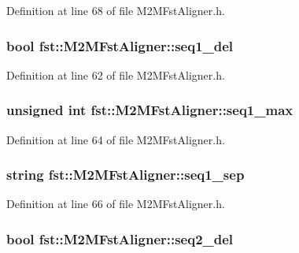 Definition at line 68 of file M2\+M\+Fst\+Aligner.\+h.

\subsubsection[{seq1\+\_\+del}]{\setlength{\rightskip}{0pt plus 5cm}bool fst\+::\+M2\+M\+Fst\+Aligner\+::seq1\+\_\+del}\hypertarget{classfst_1_1_m2_m_fst_aligner_a1ea4cfa480a906720412d89e3cbdf78f}{}\label{classfst_1_1_m2_m_fst_aligner_a1ea4cfa480a906720412d89e3cbdf78f}


Definition at line 62 of file M2\+M\+Fst\+Aligner.\+h.

\subsubsection[{seq1\+\_\+max}]{\setlength{\rightskip}{0pt plus 5cm}unsigned int fst\+::\+M2\+M\+Fst\+Aligner\+::seq1\+\_\+max}\hypertarget{classfst_1_1_m2_m_fst_aligner_ab83262d3fb217a148435777d28dcf3bd}{}\label{classfst_1_1_m2_m_fst_aligner_ab83262d3fb217a148435777d28dcf3bd}


Definition at line 64 of file M2\+M\+Fst\+Aligner.\+h.

\subsubsection[{seq1\+\_\+sep}]{\setlength{\rightskip}{0pt plus 5cm}string fst\+::\+M2\+M\+Fst\+Aligner\+::seq1\+\_\+sep}\hypertarget{classfst_1_1_m2_m_fst_aligner_a03ce5ddbcc042ece93dc2ac0dde9935d}{}\label{classfst_1_1_m2_m_fst_aligner_a03ce5ddbcc042ece93dc2ac0dde9935d}


Definition at line 66 of file M2\+M\+Fst\+Aligner.\+h.

\subsubsection[{seq2\+\_\+del}]{\setlength{\rightskip}{0pt plus 5cm}bool fst\+::\+M2\+M\+Fst\+Aligner\+::seq2\+\_\+del}\hypertarget{classfst_1_1_m2_m_fst_aligner_a5aaa4b5b87e92d8060aa23f28e9219e6}{}\label{classfst_1_1_m2_m_fst_aligner_a5aaa4b5b87e92d8060aa23f28e9219e6}


